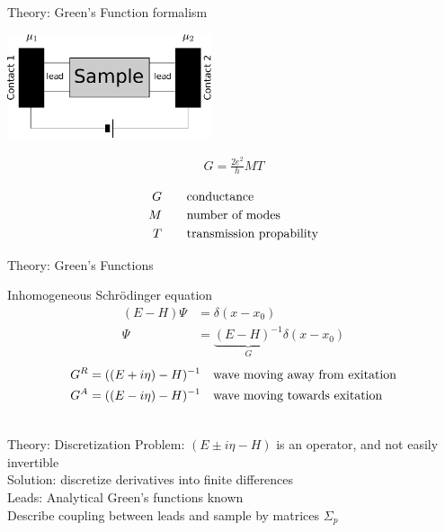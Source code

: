 \documentclass{beamer}
\begin{document}
\begin{frame}{Theory: Green's Function formalism}
    \begin{multicols}{2}
        \includegraphics[width=6cm]{sample-leads}

        \begin{align*}
            G = \frac{2 e^2}{h} MT
        \end{align*}

        \begin{align*}
            G \qquad& \textnormal{conductance}\\
            M \qquad& \textnormal{number of modes}\\
            T \qquad& \textnormal{transmission propability}
        \end{align*}
    \end{multicols}
\end{frame}

\begin{frame}{Theory: Green's Functions}
    \begin{center}
        Inhomogeneous Schrödinger equation
        \begin{align*}
            (E-H) \Psi &= \delta(x-x_0)\\
            \Psi       &= \underbrace{(E-H)^{-1}}_{G} \delta(x-x_0)
        \end{align*}
        \pause
        \begin{align*}
            G^R = ((E + i \eta) -H)^{-1}\quad & \textnormal{wave moving away from exitation}\\
            G^A = ((E - i \eta) -H)^{-1}\quad & \textnormal{wave moving
            towards exitation}
        \end{align*}

        \begin{align*}
        \end{align*}
   \end{center}
\end{frame}

\begin{frame}{Theory: Discretization}
    Problem: $(E\pm i\eta-H)$ is an operator, and not easily invertible\\[1em]

    \pause
    Solution: discretize derivatives into finite differences\\[1em]

    \pause
    Leads: Analytical Green's functions known\\[1em]

    \pause
    Describe coupling between leads and sample by matrices $\Sigma_p$
\end{frame}
\end{document}
